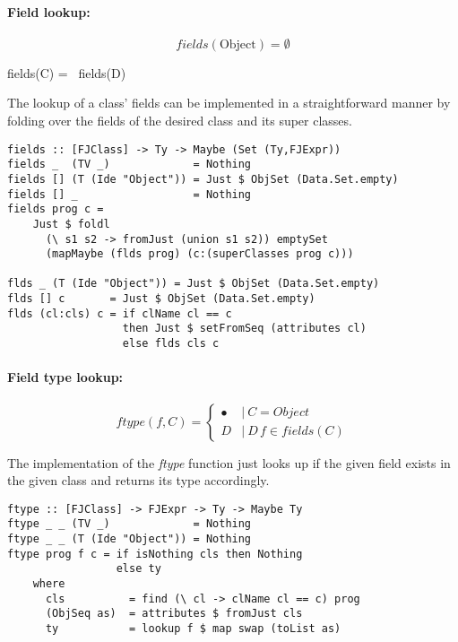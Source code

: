 \paragraph{Field lookup:}

\[ fields(\text{Object}) = \emptyset \]

           {fields(C) = \metaSet{i \in I}{\{ C_i\ f_i \}}\ \cup fields(D)}


The lookup of a class' fields can be implemented in a straightforward
manner by folding over the fields of the desired class and its super
classes.

\begin{lstlisting}
fields :: [FJClass] -> Ty -> Maybe (Set (Ty,FJExpr))
fields _  (TV _)             = Nothing
fields [] (T (Ide "Object")) = Just $ ObjSet (Data.Set.empty)
fields [] _                  = Nothing
fields prog c =
    Just $ foldl
      (\ s1 s2 -> fromJust (union s1 s2)) emptySet
      (mapMaybe (flds prog) (c:(superClasses prog c)))

flds _ (T (Ide "Object")) = Just $ ObjSet (Data.Set.empty)
flds [] c       = Just $ ObjSet (Data.Set.empty)
flds (cl:cls) c = if clName cl == c
                  then Just $ setFromSeq (attributes cl)
                  else flds cls c
\end{lstlisting}

\paragraph{Field type lookup:}

\smallskip
\[
ftype(f,C) = \begin{cases}
  \bullet & |\ C = Object \\
  D       & |\ D\, f \in fields(C)
\end{cases}
\]

\bigskip
The implementation of the \textit{ftype} function just looks up if the
given field exists in the given class and returns its type accordingly.

\smallskip
\begin{lstlisting}
ftype :: [FJClass] -> FJExpr -> Ty -> Maybe Ty
ftype _ _ (TV _)             = Nothing
ftype _ _ (T (Ide "Object")) = Nothing
ftype prog f c = if isNothing cls then Nothing
                 else ty
    where
      cls          = find (\ cl -> clName cl == c) prog
      (ObjSeq as)  = attributes $ fromJust cls
      ty           = lookup f $ map swap (toList as)
\end{lstlisting}

